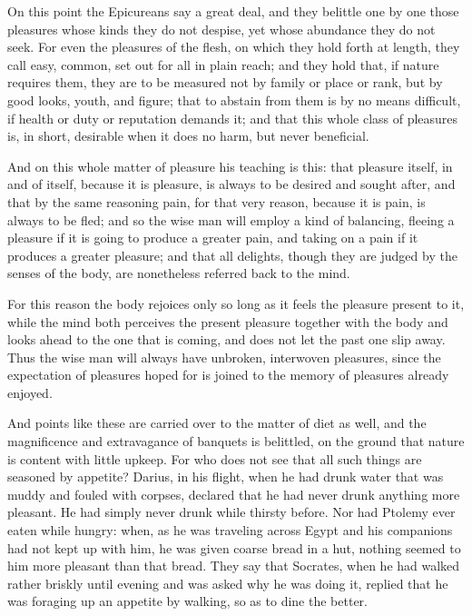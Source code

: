  On this point the Epicureans say a great deal, and they belittle one by one those pleasures whose kinds they do not despise, yet whose abundance they do not seek. For even the pleasures of the flesh, on which they hold forth at length, they call easy, common, set out for all in plain reach; and they hold that, if nature requires them, they are to be measured not by family or place or rank, but by good looks, youth, and figure; that to abstain from them is by no means difficult, if health or duty or reputation demands it; and that this whole class of pleasures is, in short, desirable when it does no harm, but never beneficial.

 And on this whole matter of pleasure his teaching is this: that pleasure itself, in and of itself, because it is pleasure, is always to be desired and sought after, and that by the same reasoning pain, for that very reason, because it is pain, is always to be fled; and so the wise man will employ a kind of balancing, fleeing a pleasure if it is going to produce a greater pain, and taking on a pain if it produces a greater pleasure; and that all delights, though they are judged by the senses of the body, are nonetheless referred back to the mind.

 For this reason the body rejoices only so long as it feels the pleasure present to it, while the mind both perceives the present pleasure together with the body and looks ahead to the one that is coming, and does not let the past one slip away. Thus the wise man will always have unbroken, interwoven pleasures, since the expectation of pleasures hoped for is joined to the memory of pleasures already enjoyed.

 And points like these are carried over to the matter of diet as well, and the magnificence and extravagance of banquets is belittled, on the ground that nature is content with little upkeep. For who does not see that all such things are seasoned by appetite? Darius, in his flight, when he had drunk water that was muddy and fouled with corpses, declared that he had never drunk anything more pleasant. He had simply never drunk while thirsty before. Nor had Ptolemy ever eaten while hungry: when, as he was traveling across Egypt and his companions had not kept up with him, he was given coarse bread in a hut, nothing seemed to him more pleasant than that bread. They say that Socrates, when he had walked rather briskly until evening and was asked why he was doing it, replied that he was foraging up an appetite by walking, so as to dine the better.

